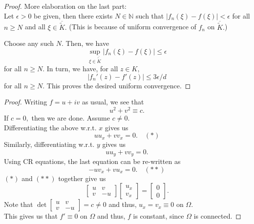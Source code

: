 \begin{proof}
	More elaboration on the last part:\\
	Let $\epsilon > 0$ be given, then there exists $N \in \mathbb{N}$ such that $\left|f_n(\xi) - f(\xi)\right| < \epsilon$ for all $n \ge N$ and all $\xi \in \overline{\tilde K}.$ (This is because of uniform convergence of $f_n$ on $\overline{\tilde K}.$)

	Choose any such $N.$ Then, we have 
	\begin{equation*} 
		\sup_{\xi \in \overline{\tilde K}}\left|f_n(\xi) - f(\xi)\right| \le \epsilon
	\end{equation*}
	for all $n \ge N.$ In turn, we have, for all $z \in K,$
	\begin{equation*} 
		|f_n'(z) - f'(z)| \le 3\epsilon/d
	\end{equation*}
	for all $n \ge N.$ This proves the desired uniform convergence.
\end{proof}



\constmodconst*\label{lem:constmodconst2}
\begin{flushright}\hyperref[lem:constmodconst]{\upsym}\end{flushright}
\begin{proof}
	Writing $f = u + iv$ as usual, we see that 
	\begin{equation*} 
		u^2 + v^2 \equiv c.
	\end{equation*}
	If $c = 0,$ then we are done. Assume $c \neq 0.$\\
	Differentiating the above w.r.t. $x$ gives us
	\begin{equation*} 
		uu_x + vv_x = 0. \quad (*)
	\end{equation*}
	Similarly, differentiating w.r.t. $y$ gives us
	\begin{equation*} 
		uu_y + vv_y = 0.
	\end{equation*}
	Using CR equations, the last equation can be re-written as
	\begin{equation*} 
		-uv_x + vu_x = 0. \quad (**)
	\end{equation*}
	$(*)$ and $(**)$ together give us
	\begin{equation*} 
		\begin{bmatrix}
			u & v\\
			v & -u
		\end{bmatrix}
		\begin{bmatrix}
			u_x\\
			v_x
		\end{bmatrix}
		= \begin{bmatrix}
			0\\
			0
		\end{bmatrix}.
	\end{equation*}
	Note that $\det\begin{bmatrix}
			u & v\\
			v & -u
		\end{bmatrix} = c \neq 0$ and thus, $u_x = v_x \equiv 0$ on $\Omega.$\\
	This gives us that $f' \equiv 0$ on $\Omega$ and thus, $f$ is constant, since $\Omega$ is connected.
\end{proof}


